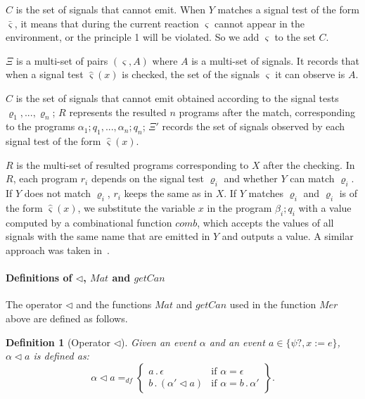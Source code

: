 \documentclass{fcs}
\newtheorem{mydef}{Definition}[section]
\newcommand{\sig}[0]{\varsigma}
\DeclareMathOperator{\seq}{;}
\newcommand{\Match}[0]{\mathit{Mat}}
\DeclareMathOperator{\nex}{.}
\newcommand{\Merge}[0]{\mathit{Mer}}
\newcommand{\append}[0]{\triangleleft}
\newcommand{\comb}[0]{\mathit{comb}}
\newcommand{\SV}[0]{\Xi}
\newcommand{\getCan}[0]{\mathit{getCan}}
\newcommand{\dddef}[0]{=_{df}}
\begin{document}
$C$ is the set of signals that cannot emit.
When $Y$ matches a signal test of the form $\bar{\sig}$, it means that during the current reaction $\sig$ cannot appear in the environment, or the principle 1 will be violated.
So we add $\sig$ to the set $C$.


$\SV$ is a multi-set of pairs $(\sig, A)$ where $A$ is a multi-set of signals.
It records that when a signal test $\hat{\sig}(x)$ is checked, the set of the signals $\sig$ it can observe is $A$.



\ifx
$C$ is the set of signals that cannot emit obtained according to the signal tests $\varrho_1,...,\varrho_n$;
$R$ represents the resulted $n$ programs after the match, corresponding to the programs $\alpha_1\seq q_1,...,\alpha_n\seq q_n$;
$\SV'$ records the set of signals observed by each signal test of the form $\hat{\sig}(x)$.
\fi

$R$ is the multi-set of resulted programs corresponding to $X$ after the checking.
In $R$, each program $r_i$ depends on the signal test $\varrho_i$ and whether $Y$ can match $\varrho_i$.
If $Y$ does not match $\varrho_i$, $r_i$ keeps the same as in $X$.
If $Y$ matches $\varrho_i$ and $\varrho_i$ is of the form $\hat{\sig}(x)$, we substitute the variable $x$ in the program $\beta_i\seq q_i$ with a value computed by a combinational function $\comb$, which accepts the values of all signals with the same name that are emitted in $Y$ and outputs a value.
A similar approach was taken in~\cite{???}.
\fi

\paragraph{Definitions of $\append$, $\Match$ and $\getCan$}
The operator $\append$ and the functions $\Match$ and $\getCan$ used in the function $\Merge$ above are defined as follows.

\begin{mydef}[Operator $\append$]
\label{label:Operator append}
    Given an event $\alpha$ and an event $a \in \{\psi?, x:=e\}$,
    $\alpha\append a$ is defined as:
    $$\alpha\append a\dddef \left\{
    \begin{array}{ll}
    a\nex \epsilon & \mbox{if $\alpha = \epsilon$}\\
    b\nex (\alpha'\append a) &\mbox{if $\alpha = b\nex \alpha'$}
    \end{array}
    \right\}.$$
\end{mydef}
\end{document}
